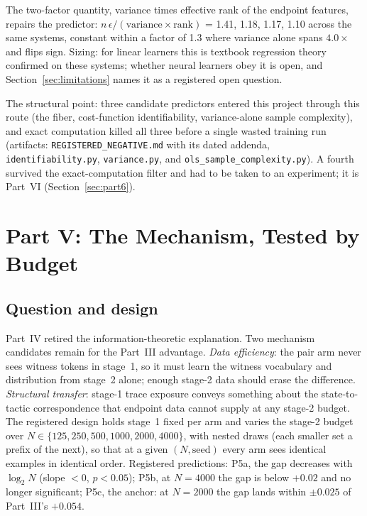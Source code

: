 The two-factor quantity, variance times effective rank of the endpoint features, repairs the predictor: $n\,\epsilon/(\mathrm{variance}\times\mathrm{rank})$ = 1.41, 1.18, 1.17, 1.10 across the same systems, constant within a factor of 1.3 where variance alone spans $4.0\times$ and flips sign. Sizing: for linear learners this is textbook regression theory confirmed on these systems; whether neural learners obey it is open, and Section~\ref{sec:limitations} names it as a registered open question.

The structural point: three candidate predictors entered this project through this route (the fiber, cost-function identifiability, variance-alone sample complexity), and exact computation killed all three before a single wasted training run (artifacts: \texttt{REGISTERED\_NEGATIVE.md} with its dated addenda, \texttt{identifiability.py}, \texttt{variance.py}, and \texttt{ols\_sample\_complexity.py}). A fourth survived the exact-computation filter and had to be taken to an experiment; it is Part~VI (Section~\ref{sec:part6}).

\section{Part V: The Mechanism, Tested by Budget}\label{sec:part5}

\subsection{Question and design}

Part~IV retired the information-theoretic explanation. Two mechanism candidates remain for the Part~III advantage. \emph{Data efficiency}: the pair arm never sees witness tokens in stage~1, so it must learn the witness vocabulary and distribution from stage~2 alone; enough stage-2 data should erase the difference. \emph{Structural transfer}: stage-1 trace exposure conveys something about the state-to-tactic correspondence that endpoint data cannot supply at any stage-2 budget. The registered design holds stage~1 fixed per arm and varies the stage-2 budget over $N \in \{125, 250, 500, 1000, 2000, 4000\}$, with nested draws (each smaller set a prefix of the next), so that at a given $(N, \text{seed})$ every arm sees identical examples in identical order. Registered predictions: P5a, the gap decreases with $\log_2 N$ (slope $< 0$, $p < 0.05$); P5b, at $N = 4000$ the gap is below $+0.02$ and no longer significant; P5c, the anchor: at $N = 2000$ the gap lands within $\pm 0.025$ of Part~III's $+0.054$.

